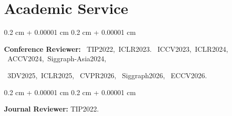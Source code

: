 \documentclass[10pt, letterpaper]{article}
\newenvironment{highlights}{
    \begin{itemize}[
        topsep=0.10 cm,
        parsep=0.10 cm,
        partopsep=0pt,
        itemsep=0pt,
        leftmargin=0.4 cm + 10pt
    ]
}{
    \end{itemize}
} %
\newenvironment{onecolentry}{
    \begin{adjustwidth}{
        0.2 cm + 0.00001 cm
    }{
        0.2 cm + 0.00001 cm
    }
}{
    \end{adjustwidth}
} %
\newenvironment{twocolentry}[2][]{
    \onecolentry
    \def\secondColumn{#2}
    \setcolumnwidth{\fill, 4.5 cm}
    \begin{paracol}{2}
}{
    \switchcolumn \raggedleft \secondColumn
    \end{paracol}
    \endonecolentry
} %
\begin{document}



            
            




    
    \section{Academic Service}



        
        \begin{onecolentry}
            \textbf{Conference Reviewer:} ~TIP2022,~ICLR2023. ~ICCV2023,~ICLR2024, ~ACCV2024,~Siggraph-Asia2024,
            
            ~3DV2025,~ICLR2025, ~CVPR2026, ~Siggraph2026, ~ECCV2026.
        \end{onecolentry}

        \vspace{0.2 cm}

        \begin{onecolentry}
            \textbf{Journal Reviewer:} TIP2022.
        \end{onecolentry}


    
\end{document}
